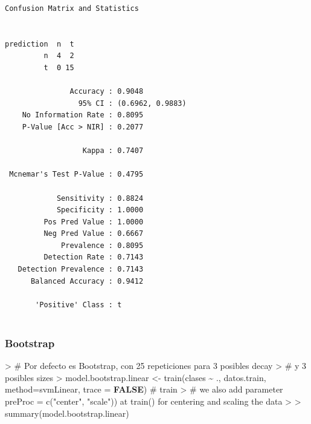 \documentclass[
]{article}
\newenvironment{Shaded}{\begin{snugshade}}{\end{snugshade}}
\newcommand{\AttributeTok}[1]{\textcolor[rgb]{0.80,0.80,0.80}{#1}}
\newcommand{\CommentTok}[1]{\textcolor[rgb]{0.50,0.62,0.50}{#1}}
\newcommand{\ConstantTok}[1]{\textcolor[rgb]{0.86,0.64,0.64}{\textbf{#1}}}
\newcommand{\ErrorTok}[1]{\textcolor[rgb]{0.76,0.75,0.62}{#1}}
\newcommand{\FunctionTok}[1]{\textcolor[rgb]{0.94,0.94,0.56}{#1}}
\newcommand{\NormalTok}[1]{\textcolor[rgb]{0.80,0.80,0.80}{#1}}
\newcommand{\OtherTok}[1]{\textcolor[rgb]{0.94,0.94,0.56}{#1}}
\newcommand{\SpecialCharTok}[1]{\textcolor[rgb]{0.86,0.64,0.64}{#1}}
\newcommand{\StringTok}[1]{\textcolor[rgb]{0.80,0.58,0.58}{#1}}
\begin{document}
\begin{verbatim}
Confusion Matrix and Statistics

          
prediction  n  t
         n  4  2
         t  0 15
                                          
               Accuracy : 0.9048          
                 95% CI : (0.6962, 0.9883)
    No Information Rate : 0.8095          
    P-Value [Acc > NIR] : 0.2077          
                                          
                  Kappa : 0.7407          
                                          
 Mcnemar's Test P-Value : 0.4795          
                                          
            Sensitivity : 0.8824          
            Specificity : 1.0000          
         Pos Pred Value : 1.0000          
         Neg Pred Value : 0.6667          
             Prevalence : 0.8095          
         Detection Rate : 0.7143          
   Detection Prevalence : 0.7143          
      Balanced Accuracy : 0.9412          
                                          
       'Positive' Class : t               
                                          
\end{verbatim}

\hypertarget{bootstrap}{%
\subsubsection{Bootstrap}\label{bootstrap}}

\begin{Shaded}
\begin{Highlighting}[]
\SpecialCharTok{\textgreater{}} \CommentTok{\# Por defecto es Bootstrap, con 25 repeticiones para 3 posibles decay}
\ErrorTok{\textgreater{}} \CommentTok{\# y 3 posibles sizes}
\ErrorTok{\textgreater{}}\NormalTok{ model.bootstrap.linear }\OtherTok{\textless{}{-}} \FunctionTok{train}\NormalTok{(clases }\SpecialCharTok{\textasciitilde{}}\NormalTok{ ., datos.train, }\AttributeTok{method=}\StringTok{\textquotesingle{}svmLinear\textquotesingle{}}\NormalTok{, }\AttributeTok{trace =} \ConstantTok{FALSE}\NormalTok{) }\CommentTok{\# train}
\SpecialCharTok{\textgreater{}} \CommentTok{\# we also add parameter \textquotesingle{}preProc = c("center", "scale"))\textquotesingle{} at train() for centering and scaling the data}
\ErrorTok{\textgreater{}} 
\ErrorTok{\textgreater{}} \FunctionTok{summary}\NormalTok{(model.bootstrap.linear)}
\end{Highlighting}
\end{Shaded}
\end{document}
